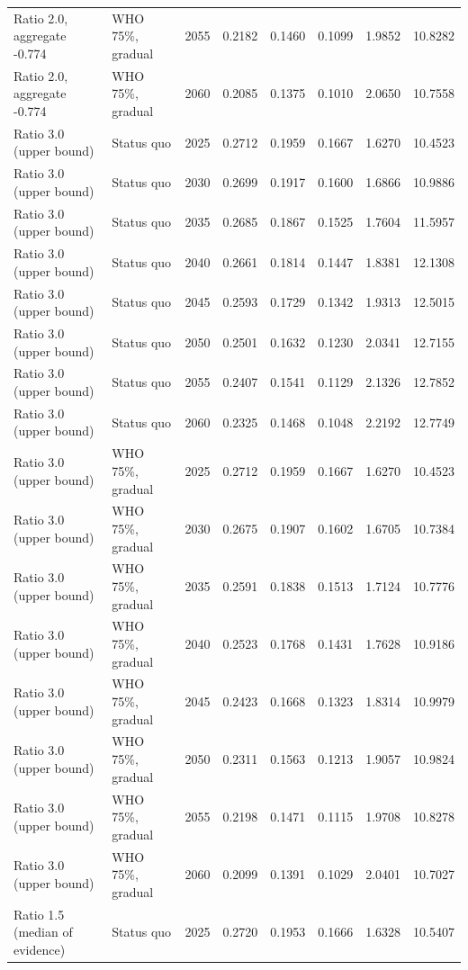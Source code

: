 \begin{longtable}{llrrrrrr}
Ratio 2.0, aggregate -0.774 & WHO 75\%, gradual & 2055 & 0.2182 & 0.1460 & 0.1099 & 1.9852 & 10.8282 \\
Ratio 2.0, aggregate -0.774 & WHO 75\%, gradual & 2060 & 0.2085 & 0.1375 & 0.1010 & 2.0650 & 10.7558 \\
Ratio 3.0 (upper bound) & Status quo & 2025 & 0.2712 & 0.1959 & 0.1667 & 1.6270 & 10.4523 \\
Ratio 3.0 (upper bound) & Status quo & 2030 & 0.2699 & 0.1917 & 0.1600 & 1.6866 & 10.9886 \\
Ratio 3.0 (upper bound) & Status quo & 2035 & 0.2685 & 0.1867 & 0.1525 & 1.7604 & 11.5957 \\
Ratio 3.0 (upper bound) & Status quo & 2040 & 0.2661 & 0.1814 & 0.1447 & 1.8381 & 12.1308 \\
Ratio 3.0 (upper bound) & Status quo & 2045 & 0.2593 & 0.1729 & 0.1342 & 1.9313 & 12.5015 \\
Ratio 3.0 (upper bound) & Status quo & 2050 & 0.2501 & 0.1632 & 0.1230 & 2.0341 & 12.7155 \\
Ratio 3.0 (upper bound) & Status quo & 2055 & 0.2407 & 0.1541 & 0.1129 & 2.1326 & 12.7852 \\
Ratio 3.0 (upper bound) & Status quo & 2060 & 0.2325 & 0.1468 & 0.1048 & 2.2192 & 12.7749 \\
Ratio 3.0 (upper bound) & WHO 75\%, gradual & 2025 & 0.2712 & 0.1959 & 0.1667 & 1.6270 & 10.4523 \\
Ratio 3.0 (upper bound) & WHO 75\%, gradual & 2030 & 0.2675 & 0.1907 & 0.1602 & 1.6705 & 10.7384 \\
Ratio 3.0 (upper bound) & WHO 75\%, gradual & 2035 & 0.2591 & 0.1838 & 0.1513 & 1.7124 & 10.7776 \\
Ratio 3.0 (upper bound) & WHO 75\%, gradual & 2040 & 0.2523 & 0.1768 & 0.1431 & 1.7628 & 10.9186 \\
Ratio 3.0 (upper bound) & WHO 75\%, gradual & 2045 & 0.2423 & 0.1668 & 0.1323 & 1.8314 & 10.9979 \\
Ratio 3.0 (upper bound) & WHO 75\%, gradual & 2050 & 0.2311 & 0.1563 & 0.1213 & 1.9057 & 10.9824 \\
Ratio 3.0 (upper bound) & WHO 75\%, gradual & 2055 & 0.2198 & 0.1471 & 0.1115 & 1.9708 & 10.8278 \\
Ratio 3.0 (upper bound) & WHO 75\%, gradual & 2060 & 0.2099 & 0.1391 & 0.1029 & 2.0401 & 10.7027 \\
Ratio 1.5 (median of evidence) & Status quo & 2025 & 0.2720 & 0.1953 & 0.1666 & 1.6328 & 10.5407 \\

\end{longtable}
